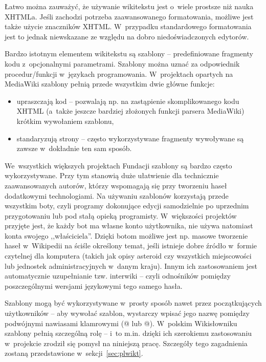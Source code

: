 Łatwo można zauważyć, że używanie wikitekstu jest o~wiele prostsze niż nauka XHTML\dywiz{}a. Jeśli zachodzi potrzeba zaawansowanego formatowania, możliwe jest także użycie znaczników XHTML. W~przypadku standardowego formatowania jest to jednak niewskazane ze względu na dobro niedoświadczonych edytorów.

Bardzo istotnym elementem wikitekstu są szablony -- predefiniowane fragmenty kodu z~opcjonalnymi parametrami. Szablony można uznać za odpowiednik procedur/funkcji w~językach programowania. W~projektach opartych na MediaWiki szablony pełnią przede wszystkim dwie główne funkcje:
\begin{itemize}
	\item upraszczają kod -- pozwalają np. na zastąpienie skomplikowanego kodu XHTML (a~także jeszcze bardziej złożonych funkcji parsera MediaWiki) krótkim wywołaniem szablonu,
	\item standaryzują strony -- często wykorzystywane fragmenty wywoływane są zawsze w~dokładnie ten sam sposób.
\end{itemize}
We~wszystkich większych projektach Fundacji szablony są bardzo często wykorzystywane. Przy tym stanowią duże ułatwienie dla technicznie zaawansowanych autorów, którzy wspomagają się przy tworzeniu haseł dodatkowymi technologiami. Na używaniu szablonów korzystają przede wszystkim boty, czyli programy dokonujące edycji samodzielnie po uprzednim przygotowaniu lub pod stałą opieką programisty. W~większości projektów przyjęte jest, że każdy bot ma własne konto użytkownika, nie używa natomiast konta swojego ,,właściciela''. Dzięki botom możliwe jest np. masowe tworzenie haseł w~Wikipedii na ściśle określony temat, jeśli istnieje dobre źródło w~formie czytelnej dla komputera (takich jak opisy asteroid czy wszystkich miejscowości lub jednostek administracyjnych w~danym kraju). Innym ich zastosowaniem jest automatycznie uzupełnianie tzw. interwiki -- czyli odnośników pomiędzy poszczególnymi wersjami językowymi tego samego hasła.

Szablony mogą być wykorzystywane w~prosty sposób nawet przez początkujących użytkowników -- aby wywołać szablon, wystarczy wpisać jego nazwę
 pomiędzy podwójnymi nawiasami klamrowymi (@ lub @). W~polskim Wikisłowniku szablony pełnią szczególną rolę -- i~to m.in. dzięki ich szerokiemu zastosowaniu w~projekcie zrodził się pomysł na niniejszą pracę. Szczegóły tego zagadnienia zostaną przedstawione w~sekcji~\ref{sec:plwikt}.

